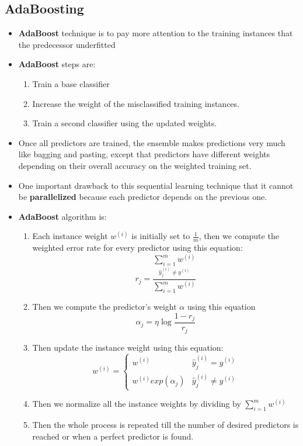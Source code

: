 \documentclass{article}
\begin{document}
   	\subsection{AdaBoosting}
	\begin{itemize}
    	\item \textbf{AdaBoost} technique is to pay more attention to the training instances that the predecessor underfitted
    	\item \textbf{AdaBoost} steps are:
    	\begin{enumerate}
    		\item Train a base classifier
    		\item Increase the weight of the misclassified training instances.
    		\item Train a second classifier using the updated weights.
    	\end{enumerate}
    	\item Once all predictors are trained, the ensemble makes predictions very much like bagging and pasting, except that predictors have different weights depending on their overall accuracy on the weighted training set.
    	\item One important drawback to this sequential learning technique that it cannot be \textbf{parallelized} because each predictor depends on the previous one.
    	\item \textbf{AdaBoost} algorithm is:
    	\begin{enumerate}
    		\item Each instance weight \textit{$w^{(i)}$} is initially set to \textbf{$\frac{1}{m}$}, then we compute the weighted error rate for every predictor using this equation:
    		\[ r_{j} = \frac{\underset{\hat{y}_{j}^{(i)} \neq y^{(i)}}{\sum_{i = 1}^{m} w^{(i)}}}{\sum_{i = 1}^{m} w^{(i)}}\]
    		\item Then we compute the predictor's weight $\alpha$ using this equation
    		\[ \alpha_{j} = \eta \log \frac{1 - r_{j}}{r_{j}} \]
    		\item Then update the instance weight using this equation:
    		\[ w^{(i)} = \begin{cases} 
      			w^{(i)} & \hat{y}_{j}^{(i)} = y^{(i)} \\
      			w^{(i)} exp(\alpha_{j}) & \hat{y}_{j}^{(i)} \neq y^{(i)}
   				\end{cases}
			\]
			\item Then we normalize all the instance weights by dividing by $\sum_{i = 1}^{m} w^{(i)}$
			\item Then the whole process is repeated till the number of desired predictors is reached or when a perfect predictor is found.

\end{enumerate}
\end{itemize}
\end{document}
